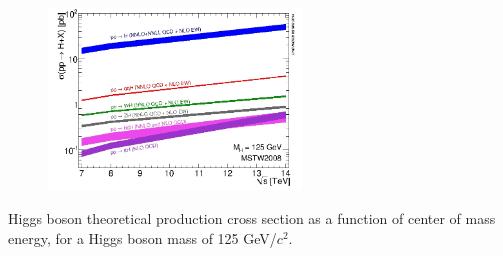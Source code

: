 \begin{frame}{}
\vspace{-.2cm}
\begin{figure}[!Hhtbp]
  \begin{center}
    \includegraphics[width=0.6\textwidth]{../figs/7-14_Higgs_xsec.jpg}
  \end{center}
\end{figure}

\vspace{-.2cm}
    \begin{block}{}
      \tiny \centering Higgs boson theoretical production cross section as a function of center of mass energy, for a Higgs boson mass of 125 GeV/$c^{2}$.
    \end{block}

\end{frame}

